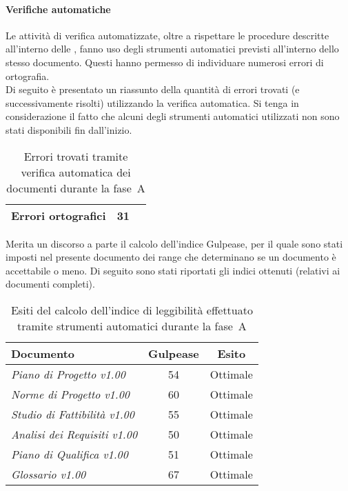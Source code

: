 \documentclass[../PianoDiQualifica.tex]{subfiles}
\begin{document}
\begin{appendices}
			\paragraph{Verifiche automatiche}
			Le attività di verifica automatizzate, oltre a rispettare le procedure descritte all'interno delle \normediprogettov, fanno uso degli strumenti automatici previsti all'interno dello stesso documento. Questi hanno permesso di individuare numerosi errori di ortografia.\\
			Di seguito è presentato un riassunto della quantità di errori trovati (e successivamente risolti) utilizzando la verifica automatica. Si tenga in considerazione il fatto che alcuni degli strumenti automatici utilizzati non sono stati disponibili fin dall'inizio.
\begin{table}[H]
		\centering
		\begin{tabular}{l * {2}{c}}
			\midrule
			Errori ortografici &	31 \\
			\midrule
		\end{tabular}
		\caption{Errori trovati tramite verifica automatica dei documenti durante la fase\g\ A}
		\label{tab:errori_automatica}
\end{table}	
			Merita un discorso a parte il calcolo dell'indice Gulpease\g, per il quale sono stati imposti nel presente documento dei range che determinano se un documento è accettabile o meno. Di seguito sono stati riportati gli indici ottenuti (relativi ai documenti completi).
\begin{table}[H]
		\centering
		\begin{tabular}{l * {2}{c}}
			\toprule
			\textbf{Documento} & \textbf{Gulpease} & \textbf{Esito} \\
			\midrule
			\textit{Piano di Progetto v1.00} & 54 &  Ottimale \\
			\textit{Norme di Progetto v1.00} & 60 & Ottimale \\
			\textit{Studio di Fattibilità v1.00} & 55 & Ottimale \\
			\textit{Analisi dei Requisiti v1.00} & 50 & Ottimale \\
			\textit{Piano di Qualifica v1.00} & 51 & Ottimale \\
			\textit{Glossario v1.00} & 67 & Ottimale \\
			\bottomrule
		\end{tabular}
		\caption{Esiti del calcolo dell’indice di leggibilità effettuato tramite strumenti automatici durante la fase\g\ A}
		\label{tab:esiti_gulpease}
\end{table}

\end{appendices}
\end{document}
